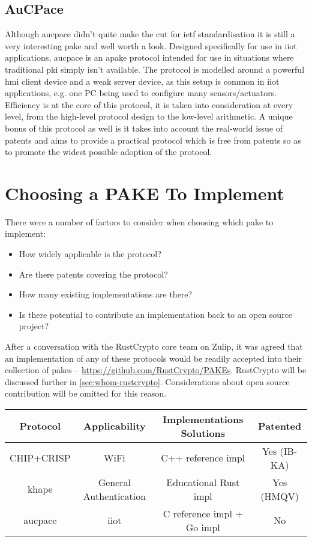 \subsection{AuCPace}
Although \gls{aucpace} \cite{aucpace} didn't quite make the cut for \gls{ietf} standardisation it is still a very interesting \gls{pake} and well worth a look.
Designed specifically for use in \gls{iiot} applications, \gls{aucpace} is an \gls{apake} protocol intended for use in situations where traditional \gls{pki} simply isn't available.
The protocol is modelled around a powerful \gls{hmi} client device and a weak server device, as this setup is common in \gls{iiot} applications, e.g. one PC being used to configure many sensors/actuators.
Efficiency is at the core of this protocol, it is taken into consideration at every level, from the high-level protocol design to the low-level arithmetic.
A unique bonus of this protocol as well is it takes into account the real-world issue of patents and aims to provide a practical protocol which is free from patents so as to promote the widest possible adoption of the protocol.

\clearpage
\section{Choosing a PAKE To Implement}
There were a number of factors to consider when choosing which \gls{pake} to implement:
\begin{itemize}
  \item{How widely applicable is the protocol?}
  \item{Are there patents covering the protocol?}
  \item{How many existing implementations are there?}
  \item{Is there potential to contribute an implementation back to an open source project?}
\end{itemize}

After a conversation with the RustCrypto core team on Zulip, it was agreed that an implementation of any of these protocols would be readily accepted into their collection of \glspl{pake} -- \url{https://github.com/RustCrypto/PAKEs}.
RustCrypto will be discussed further in \cref{sec:whom-rustcrypto}.
Considerations about open source contribution will be omitted for this reason.

\begin{center}
  \small
  \begin{tabular}{ cccc }
    \toprule
    Protocol & Applicability & Implementations Solutions & Patented \\
    \midrule
    CHIP+CRISP & WiFi & C++ reference impl &  Yes (IB-KA)\\
    \gls{khape} & General Authentication & Educational Rust impl &  Yes (HMQV)\\
    \gls{aucpace} & \gls{iiot} & C reference impl + Go impl & No\\
    \bottomrule
  \end{tabular}
\end{center}

